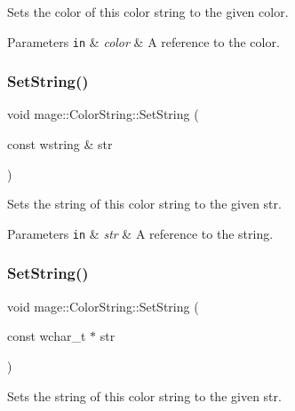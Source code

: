 Sets the color of this color string to the given color.


\begin{DoxyParams}[1]{Parameters}
\mbox{\tt in}  & {\em color} & A reference to the color. \\
\hline
\end{DoxyParams}
\hypertarget{structmage_1_1_color_string_aa5ec8bb8e44683ed8a88534f04639930}{}\label{structmage_1_1_color_string_aa5ec8bb8e44683ed8a88534f04639930} 
\subsubsection{\texorpdfstring{Set\+String()}{SetString()}\hspace{0.1cm}{\footnotesize\ttfamily [1/2]}}
{\footnotesize\ttfamily void mage\+::\+Color\+String\+::\+Set\+String (\begin{DoxyParamCaption}\item[{const wstring \&}]{str }\end{DoxyParamCaption})}

Sets the string of this color string to the given str.


\begin{DoxyParams}[1]{Parameters}
\mbox{\tt in}  & {\em str} & A reference to the string. \\
\hline
\end{DoxyParams}
\hypertarget{structmage_1_1_color_string_a317caadad725b67ede68f1e474e47d3b}{}\label{structmage_1_1_color_string_a317caadad725b67ede68f1e474e47d3b} 
\subsubsection{\texorpdfstring{Set\+String()}{SetString()}\hspace{0.1cm}{\footnotesize\ttfamily [2/2]}}
{\footnotesize\ttfamily void mage\+::\+Color\+String\+::\+Set\+String (\begin{DoxyParamCaption}\item[{const wchar\+\_\+t $\ast$}]{str }\end{DoxyParamCaption})}

Sets the string of this color string to the given str.

